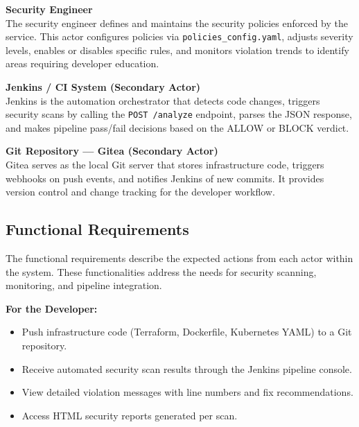 \vspace{0.3cm}
\noindent\textbf{Security Engineer} \\
The security engineer defines and maintains the security policies enforced by the service. This actor configures policies via \texttt{policies\_config.yaml}, adjusts severity levels, enables or disables specific rules, and monitors violation trends to identify areas requiring developer education.

\vspace{0.3cm}
\noindent\textbf{Jenkins / CI System (Secondary Actor)} \\
Jenkins is the automation orchestrator that detects code changes, triggers security scans by calling the \texttt{POST /analyze} endpoint, parses the JSON response, and makes pipeline pass/fail decisions based on the ALLOW or BLOCK verdict.

\vspace{0.3cm}
\noindent\textbf{Git Repository — Gitea (Secondary Actor)} \\
Gitea serves as the local Git server that stores infrastructure code, triggers webhooks on push events, and notifies Jenkins of new commits. It provides version control and change tracking for the developer workflow.

\subsection{Functional Requirements}

The functional requirements describe the expected actions from each actor within the system. These functionalities address the needs for security scanning, monitoring, and pipeline integration.

\vspace{0.3cm}
\noindent\textbf{For the Developer:}
\begin{itemize}
    \item Push infrastructure code (Terraform, Dockerfile, Kubernetes YAML) to a Git repository.
    \item Receive automated security scan results through the Jenkins pipeline console.
    \item View detailed violation messages with line numbers and fix recommendations.
    \item Access HTML security reports generated per scan.
\end{itemize}

